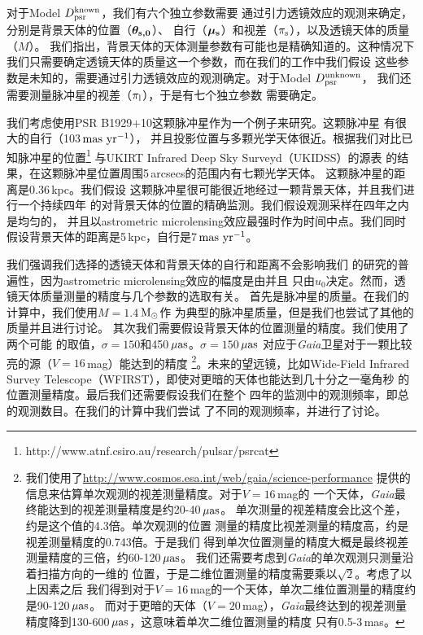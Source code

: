 对于Model $D_{\rm{psr}}^{\rm{known}}$，我们有六个独立参数需要
通过引力透镜效应的观测来确定，分别是背景天体的位置（$\bm{\theta_{\rm{s,0}}}$）、
自行（$\bm{\mu_{\rm{s}}}$）和视差（$\pi_{\rm{s}}$），以及透镜天体的质量（$M$）。
我们指出，背景天体的天体测量参数有可能也是精确知道的。这种情况下
我们只需要确定透镜天体的质量这一个参数，而在我们的工作中我们假设
这些参数是未知的，需要通过引力透镜效应的观测确定。对于Model $D_{\rm{psr}}^{\rm{unknown}}$，
我们还需要测量脉冲星的视差（$\pi_{\rm{l}}$），于是有七个独立参数
需要确定。

我们考虑使用PSR B1929$+$10这颗脉冲星作为一个例子来研究。这颗脉冲星
有很大的自行（103\,$\rm{mas\ yr^{-1}}$）\supercite{Chatterjee04}，
并且投影位置与多颗光学天体很近。根据我们对比已知脉冲星的位置\supercite{Manchester05}\footnote{http://www.atnf.csiro.au/research/pulsar/psrcat} 
与UKIRT Infrared Deep Sky Surveyd（UKIDSS）的源表\supercite{Lawrence}
的结果，在这颗脉冲星位置周围5\,arcsecs的范围内有七颗光学天体。
这颗脉冲星的距离是0.36\,kpc\supercite{Chatterjee04}。我们假设
这颗脉冲星很可能很近地经过一颗背景天体，并且我们进行一个持续四年
的对背景天体的位置的精确监测。我们假设观测采样在四年之内是均匀的，
并且以astrometric microlensing效应最强时作为时间中点。我们同时
假设背景天体的距离是5\,kpc，自行是7\,$\rm{mas\ yr^{-1}}$。

%
我们强调我们选择的透镜天体和背景天体的自行和距离不会影响我们
的研究的普遍性，因为astrometric microlensing效应的幅度是由并且
只由$u_0$决定。然而，透镜天体质量测量的精度与几个参数的选取有关。
首先是脉冲星的质量。在我们的计算中，我们使用$M=1.4$\,$\rm{M_{\odot}}$作
为典型的脉冲星质量，但是我们也尝试了其他的质量并且进行讨论。
其次我们需要假设背景天体的位置测量的精度。我们使用了两个可能
的取值，$\sigma=150$和450\,$\rm{\mu as}$。$\sigma=150$\,$\rm{\mu as}$
对应于\textit{Gaia}卫星对于一颗比较亮的源（$V=16$\,mag）能达到的精度
\footnote{我们使用了\url{http://www.cosmos.esa.int/web/gaia/science-performance} 
提供的信息来估算单次观测的视差测量精度。对于$V=16$\,mag的
一个天体，\textit{Gaia}最终能达到的视差测量精度是约20-40\,$\rm{\mu as}$。
单次测量的视差精度会比这个差，约是这个值的4.3倍。单次观测的位置
测量的精度比视差测量的精度高，约是视差测量精度的0.743倍。于是我们
得到单次位置测量的精度大概是最终视差测量精度的三倍，约60-120\,$\rm{\mu as}$。
我们还需要考虑到\textit{Gaia}的单次观测只测量沿着扫描方向的一维的
位置，于是二维位置测量的精度需要乘以$\sqrt{2}$。考虑了以上因素之后
我们得到对于$V=16$\,mag的一个天体，单次二维位置测量的精度约是90-120\,$\rm{\mu as}$。
而对于更暗的天体（$V=20$\,mag），\textit{Gaia}最终达到的视差测量
精度降到130-600\,$\rm{\mu as}$，这意味着单次二维位置测量的精度
只有0.5-3\,mas。}。未来的望远镜，比如Wide-Field Infrared Survey 
Telescope（WFIRST），即使对更暗的天体也能达到几十分之一毫角秒
的位置测量精度\supercite{Spergel}。最后我们还需要假设我们在整个
四年的监测中的观测频率，即总的观测数目。在我们的计算中我们尝试
了不同的观测频率，并进行了讨论。


